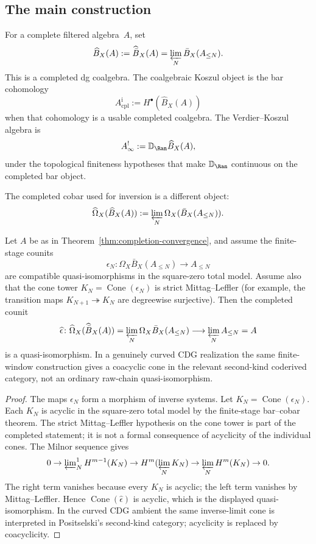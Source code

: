 \subsection{The main construction}

\begin{construction}\label{const:completed-koszul}
For a complete filtered algebra~$A$, set
\[
\widehat B_X(A):=\widehat{\bar B}_X(A)
=\varprojlim_N\bar B_X(A_{\le N}).
\]
This is a completed dg coalgebra.  The coalgebraic Koszul object is
the bar cohomology
\[
A^{\mathrm i}_{\mathrm{cpl}}:=H^\bullet(\widehat B_X(A))
\]
when that cohomology is a usable completed coalgebra.  The
Verdier--Koszul algebra is
\[
A^!_\infty:=\mathbb D_{\Ran}\widehat B_X(A),
\]
under the topological finiteness hypotheses that make
$\mathbb D_{\Ran}$ continuous on the completed bar object.

The completed cobar used for inversion is a different object:
\[
\widehat\Omega_X(\widehat B_X(A))
:=\varprojlim_N\Omega_X(\bar B_X(A_{\le N})).
\]
\end{construction}

\begin{theorem}\label{thm:completed-bar-cobar}
Let $A$ be as in Theorem~\textup{\ref{thm:completion-convergence}},
and assume the finite-stage counits
\[
\epsilon_N\colon \Omega_X\bar B_X(A_{\le N})\longrightarrow A_{\le N}
\]
are compatible quasi-isomorphisms in the square-zero total model.
Assume also that the cone tower
$K_N=\operatorname{Cone}(\epsilon_N)$ is strict Mittag--Leffler
\textup{(}for example, the transition maps
$K_{N+1}\twoheadrightarrow K_N$ are degreewise surjective\textup{)}.
Then the completed counit
\[
\widehat\epsilon\colon
\widehat\Omega_X(\widehat{\bar B}_X(A))
=\varprojlim_N\Omega_X\bar B_X(A_{\le N})
\longrightarrow
\varprojlim_N A_{\le N}=A
\]
is a quasi-isomorphism.  In a genuinely curved CDG realization the
same finite-window construction gives a coacyclic cone in the relevant
second-kind coderived category, not an ordinary raw-chain
quasi-isomorphism.
\end{theorem}

\begin{proof}
The maps $\epsilon_N$ form a morphism of inverse systems.  Let
$K_N=\operatorname{Cone}(\epsilon_N)$.  Each $K_N$ is acyclic in the
square-zero total model by the finite-stage bar--cobar theorem.  The
strict Mittag--Leffler hypothesis on the cone tower is part of the
completed statement; it is not a formal consequence of acyclicity of
the individual cones.  The Milnor
sequence gives
\[
0\to\varprojlim\nolimits_N^1H^{m-1}(K_N)
\to H^m(\varprojlim_NK_N)
\to \varprojlim_NH^m(K_N)\to0.
\]
The right term vanishes because every $K_N$ is acyclic; the left term
vanishes by Mittag--Leffler.  Hence
$\operatorname{Cone}(\widehat\epsilon)$ is acyclic, which is the
displayed quasi-isomorphism.  In the curved CDG ambient the same
inverse-limit cone is interpreted in Positselski's second-kind
category; acyclicity is replaced by coacyclicity.
\end{proof}

